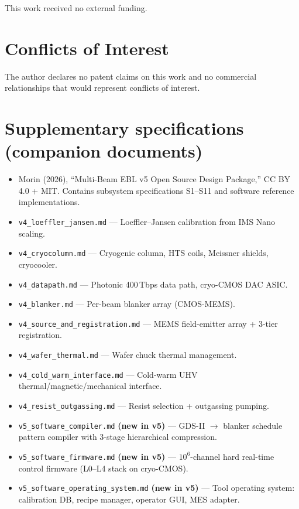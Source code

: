 \documentclass[11pt,letterpaper]{article}
\begin{document}
This work received no external funding.

\section*{Conflicts of Interest}

The author declares no patent claims on this work and no commercial relationships that would represent conflicts of interest.

\section*{Supplementary specifications (companion documents)}

\begin{itemize}[leftmargin=1.6em]
  \item [S0] Morin (2026), ``Multi-Beam EBL v5 Open Source Design Package,'' CC BY 4.0 + MIT. Contains subsystem specifications S1--S11 and software reference implementations.
  \item [S1] \texttt{v4\_loeffler\_jansen.md} --- Loeffler--Jansen calibration from IMS Nano scaling.
  \item [S2] \texttt{v4\_cryocolumn.md} --- Cryogenic column, HTS coils, Meissner shields, cryocooler.
  \item [S3] \texttt{v4\_datapath.md} --- Photonic 400\,Tbps data path, cryo-CMOS DAC ASIC.
  \item [S4] \texttt{v4\_blanker.md} --- Per-beam blanker array (CMOS-MEMS).
  \item [S5] \texttt{v4\_source\_and\_registration.md} --- MEMS field-emitter array + 3-tier registration.
  \item [S6] \texttt{v4\_wafer\_thermal.md} --- Wafer chuck thermal management.
  \item [S7] \texttt{v4\_cold\_warm\_interface.md} --- Cold-warm UHV thermal/magnetic/mechanical interface.
  \item [S8] \texttt{v4\_resist\_outgassing.md} --- Resist selection + outgassing pumping.
  \item [S9] \texttt{v5\_software\_compiler.md} \textbf{(new in v5)} --- GDS-II $\to$ blanker schedule pattern compiler with 3-stage hierarchical compression.
  \item [S10] \texttt{v5\_software\_firmware.md} \textbf{(new in v5)} --- $10^6$-channel hard real-time control firmware (L0--L4 stack on cryo-CMOS).
  \item [S11] \texttt{v5\_software\_operating\_system.md} \textbf{(new in v5)} --- Tool operating system: calibration DB, recipe manager, operator GUI, MES adapter.
\end{itemize}
\end{document}
